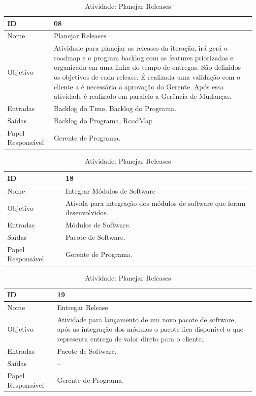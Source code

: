   \begin{table}[H]
    \centering
      \begin{tabular}{| m{5em} | m{10cm} |}
        \hline
        ID       & 08   \\ \hline
        Nome     & Planejar Releases  \\ \hline
        Objetivo & Atividade para planejar as releases da iteração, irá gerá o roadmap e o program backlog com as features priorizadas e organizada em uma linha do tempo de entregas. São definidos os objetivos de cada release. É realizada uma validação com o cliente a é necessária a aprovação do Gerente. Após essa atividade é realizado em paralelo a Gerência de Mudanças. \\ \hline
        Entradas & Backlog do Time, Backlog do Programa. \\ \hline
        Saídas   & Backlog do Programa, RoadMap \\ \hline
        Papel Responsável   & Gerente de Programa. \\ \hline
      \end{tabular}
      \caption{Atividade: Planejar Releases}
      \label{tabela:atividade8}
  \end{table}

  \begin{table}[H]
    \centering
      \begin{tabular}{| m{5em} | m{10cm} |}
        \hline
        ID       & 18   \\ \hline
        Nome     & Integrar Módulos de Software  \\ \hline
        Objetivo & Ativida para integração dos módulos de software que foram desenvolvidos. \\ \hline
        Entradas & Módulos de Software. \\ \hline
        Saídas   & Pacote de Software. \\ \hline
        Papel Responsável   & Gerente de Programa. \\ \hline
      \end{tabular}
      \caption{Atividade: Planejar Releases}
      \label{tabela:atividade18}
  \end{table}

  \begin{table}[H]
    \centering
      \begin{tabular}{| m{5em} | m{10cm} |}
        \hline
        ID       & 19   \\ \hline
        Nome     & Entregar Release  \\ \hline
        Objetivo & Atividade para lançamento de um novo pacote de software, após as integração dos módulos o pacote fica disponível o que representa entrega de valor direto para o cliente. \\ \hline
        Entradas & Pacote de Software. \\ \hline
        Saídas   & -- \\ \hline
        Papel Responsável   & Gerente de Programa. \\ \hline
      \end{tabular}
      \caption{Atividade: Planejar Releases}
      \label{tabela:atividade16}
  \end{table}

